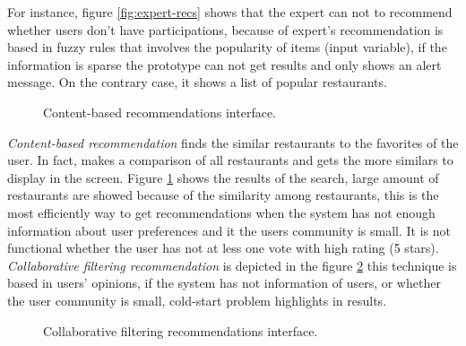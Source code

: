 For instance, figure \ref{fig:expert-recs} shows that the expert can 
not to recommend
whether users don’t have participations, because of expert's
recommendation is based in fuzzy rules that involves the popularity of
items (input variable), if the information is sparse the prototype can
not get results and only shows an alert message. On the contrary case,
it shows a list of popular restaurants.\\ 
\begin{figure}
\captionsetup{font=footnotesize}
\centering
{}
\caption{Content-based recommendations interface.}
\label{fig:base-content}   
\end{figure}
\textit{Content-based recommendation} finds the similar restaurants to the
favorites of the user. In fact, makes a comparison of all restaurants
and gets the more similars to display in the screen. 
Figure \ref{fig:base-content}  
 shows the results of the search, large amount of restaurants are showed
because of the similarity among restaurants, this is the most
efficiently way to get recommendations when the system has not enough
information about user preferences and it the users community is
small. It is not functional whether the user has not at less one vote
with high rating (5 stars).\\ 
\textit{Collaborative filtering recommendation} is depicted in the 
figure \ref{fig:cf-recs}
this technique is based in users' opinions, if the system has not
information of users, or whether the user community is small, 
cold-start problem highlights in results. 
\begin{figure}
\captionsetup{font=footnotesize}
\centering
{}
\caption{Collaborative filtering recommendations interface.}
\label{fig:cf-recs}   
\end{figure}
